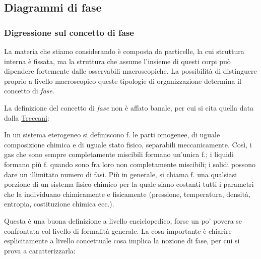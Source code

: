 \subsection{Diagrammi di fase}

\subsubsection{Digressione sul concetto di fase}
La materia che stiamo considerando è composta da particelle, la cui struttura interna è fissata, ma la struttura che assume l'insieme di questi corpi può dipendere fortemente dalle osservabili macroscopiche. La possibilità di distinguere proprio a livello macroscopico queste tipologie di organizzazione determina il concetto di \textit{fase}.

La definizione del concetto di \textit{fase} non è affato banale, per cui si cita quella data dalla \href{http://www.treccani.it/enciclopedia/fase/#chimica-1}{Treccani}:

\begin{defn}[Fase]
	In un sistema eterogeneo si definiscono f. le parti omogenee, di uguale composizione chimica e di uguale stato fisico, separabili meccanicamente. Così, i gas che sono sempre completamente miscibili formano un’unica f.; i liquidi formano più f. quando sono fra loro non completamente miscibili; i solidi possono dare un illimitato numero di fasi. Più in generale, si chiama f. una qualsiasi porzione di un sistema fisico-chimico per la quale siano costanti tutti i parametri che la individuano chimicamente e fisicamente (pressione, temperatura, densità, entropia, costituzione chimica ecc.).
\end{defn}

Questa è una buona definizione a livello enciclopedico, forse un po' povera se confrontata col livello di formalità generale. La cosa importante è chiarire esplicitamente a livello concettuale cosa implica la nozione di fase, per cui si prova a caratterizzarla:

